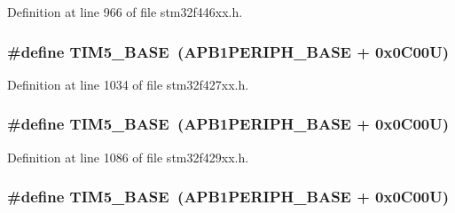 Definition at line 966 of file stm32f446xx.\+h.

\subsubsection[{\texorpdfstring{T\+I\+M5\+\_\+\+B\+A\+SE}{TIM5_BASE}}]{\setlength{\rightskip}{0pt plus 5cm}\#define T\+I\+M5\+\_\+\+B\+A\+SE~({\bf A\+P\+B1\+P\+E\+R\+I\+P\+H\+\_\+\+B\+A\+SE} + 0x0\+C00\+U)}\hypertarget{group___peripheral__memory__map_ga3e1671477190d065ba7c944558336d7e}{}\label{group___peripheral__memory__map_ga3e1671477190d065ba7c944558336d7e}


Definition at line 1034 of file stm32f427xx.\+h.

\subsubsection[{\texorpdfstring{T\+I\+M5\+\_\+\+B\+A\+SE}{TIM5_BASE}}]{\setlength{\rightskip}{0pt plus 5cm}\#define T\+I\+M5\+\_\+\+B\+A\+SE~({\bf A\+P\+B1\+P\+E\+R\+I\+P\+H\+\_\+\+B\+A\+SE} + 0x0\+C00\+U)}\hypertarget{group___peripheral__memory__map_ga3e1671477190d065ba7c944558336d7e}{}\label{group___peripheral__memory__map_ga3e1671477190d065ba7c944558336d7e}


Definition at line 1086 of file stm32f429xx.\+h.

\subsubsection[{\texorpdfstring{T\+I\+M5\+\_\+\+B\+A\+SE}{TIM5_BASE}}]{\setlength{\rightskip}{0pt plus 5cm}\#define T\+I\+M5\+\_\+\+B\+A\+SE~({\bf A\+P\+B1\+P\+E\+R\+I\+P\+H\+\_\+\+B\+A\+SE} + 0x0\+C00\+U)}\hypertarget{group___peripheral__memory__map_ga3e1671477190d065ba7c944558336d7e}{}\label{group___peripheral__memory__map_ga3e1671477190d065ba7c944558336d7e}


